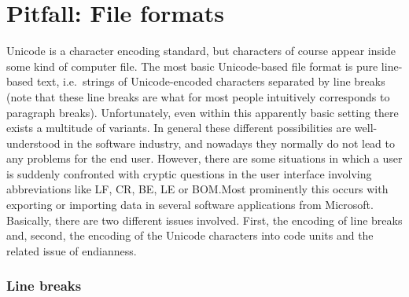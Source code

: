 

\section{Pitfall: File formats}
\label{pitfall-file-formats}

Unicode is a character encoding standard, but characters of course 
appear inside some kind of computer file. The most basic Unicode-based file
format is pure line-based text, i.e.~strings of Unicode-encoded characters
separated by line breaks (note that these line breaks are what for most people
intuitively corresponds to paragraph breaks). Unfortunately, even within this
apparently basic setting there exists a multitude of variants. In general these
different possibilities are well-understood in the software industry, and
nowadays they normally do not lead to any problems for the end user. However,
there are some situations in which a user is suddenly confronted with cryptic
questions in the user interface involving abbreviations like LF, CR, BE, LE or
BOM.\@ Most prominently this occurs with exporting or importing data in several
software applications from Microsoft. Basically, there are two different issues
involved. First, the encoding of line breaks and, second, the encoding of the
Unicode characters into code units and the related issue of endianness.

\subsubsection*{Line breaks}

